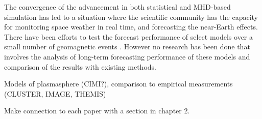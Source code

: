 The convergence of the advancement in both statistical and MHD-based simulation has led to a situation where the scientific community has the capacity for monitoring space weather in real time, and forecasting the near-Earth effects.  There have been efforts to test the forecast performance of select models over a small number of geomagnetic events \cite{ANNforecast,StormModel,StatCompStorms,Yermolaev}. However no research has been done that involves the analysis of long-term forecasting performance of these models and comparison of the results with existing methods.

\note Models of plasmasphere (CIMI?), comparison to empirical measurements (CLUSTER, IMAGE, THEMIS)

\note Make connection to each paper with a section in chapter 2.

